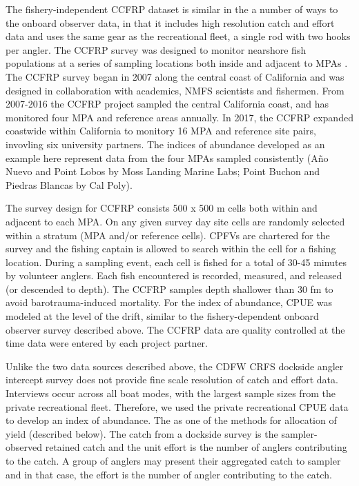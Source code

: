 \documentclass[
  12pt,
  authoryear,
  preprint,
  3p]{elsarticle}
\begin{document}
The fishery-independent CCFRP dataset is similar in the a number of ways
to the onboard observer data, in that it includes high resolution catch
and effort data and uses the same gear as the recreational fleet, a
single rod with two hooks per angler. The CCFRP survey was designed to
monitor nearshore fish populations at a series of sampling locations
both inside and adjacent to MPAs
\citep{starr_variation_2015a, wendt_collaborative_2009}. The CCFRP
survey began in 2007 along the central coast of California and was
designed in collaboration with academics, NMFS scientists and fishermen.
From 2007-2016 the CCFRP project sampled the central California coast,
and has monitored four MPA and reference areas annually. In 2017, the
CCFRP expanded coastwide within California to monitory 16 MPA and
reference site pairs, invovling six university partners. The indices of
abundance developed as an example here represent data from the four MPAs
sampled consistently (Año Nuevo and Point Lobos by Moss Landing Marine
Labs; Point Buchon and Piedras Blancas by Cal Poly).

The survey design for CCFRP consists 500 x 500 m cells both within and
adjacent to each MPA. On any given survey day site cells are randomly
selected within a stratum (MPA and/or reference cells). CPFVs are
chartered for the survey and the fishing captain is allowed to search
within the cell for a fishing location. During a sampling event, each
cell is fished for a total of 30-45 minutes by volunteer anglers. Each
fish encountered is recorded, measured, and released (or descended to
depth). The CCFRP samples depth shallower than 30 fm to avoid
barotrauma-induced mortality. For the index of abundance, CPUE was
modeled at the level of the drift, similar to the fishery-dependent
onboard observer survey described above. The CCFRP data are quality
controlled at the time data were entered by each project partner.

Unlike the two data sources described above, the CDFW CRFS dockside
angler intercept survey does not provide fine scale resolution of catch
and effort data. Interviews occur across all boat modes, with the
largest sample sizes from the private recreational fleet. Therefore, we
used the private recreational CPUE data to develop an index of
abundance. The as one of the methods for allocation of yield (described
below). The catch from a dockside survey is the sampler-observed
retained catch and the unit effort is the number of anglers contributing
to the catch. A group of anglers may present their aggregated catch to
sampler and in that case, the effort is the number of angler
contributing to the catch.
\end{document}
